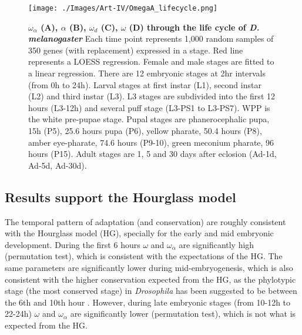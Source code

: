 \begin{figure}[t]
  \texttt{[image: ./Images/Art-IV/OmegaA\_lifecycle.png]}
  \centering
  \caption{\textbf{ {\large$\omega_{\alpha}$} (A),  {\large$\alpha$} (B), {\large$\omega_{d}$} (C), {\large$\omega$} (D) through the life cycle of \textit{D. melanogaster}} Each time point represents 1,000 random samples of 350 genes (with replacement) expressed in a stage. Red line represents a LOESS regression. Female and male stages are fitted to a linear regression. There are 12 embryonic stages at 2hr intervals (from 0h to 24h). Larval stages at first instar (L1), second instar (L2) and third instar (L3). L3 stages are subdivided into the first 12 hours (L3-12h) and several puff stage (L3-PS1 to L3-PS7). WPP is the white pre-pupae stage. Pupal stages are phanerocephalic pupa, 15h (P5), 25.6 hours pupa (P6), yellow pharate, 50.4 hours (P8), amber eye-pharate, 74.6 hours (P9-10), green meconium pharate, 96 hours (P15). Adult stages are 1, 5 and 30 days after eclosion (Ad-1d, Ad-5d, Ad-30d).
  }
  \label{fig:Art-IV-OmegaA_lifecycle}
\end{figure}

\subsection{Results support the Hourglass model}

The temporal pattern of adaptation (and conservation) are roughly consistent with the Hourglass model (HG), specially for the early and mid embryonic development.
During the first 6 hours $\omega$ and $\omega_{\alpha}$ are significantly high (permutation test), which is consistent with the expectations of the HG.
The same parameters are significantly lower during mid-embryogenesis, which is also consistent with the higher conservation expected from the HG, as the phylotypic stage (the most conserved stage) in \textit{Drosophila} has been suggested to be between the 6th and 10th hour \citep{Drost2015}.
However, during late embryonic stages (from 10-12h to 22-24h) $\omega$ and $\omega_{\alpha}$ are significantly lower (permutation test), which is not what is expected from the HG.

